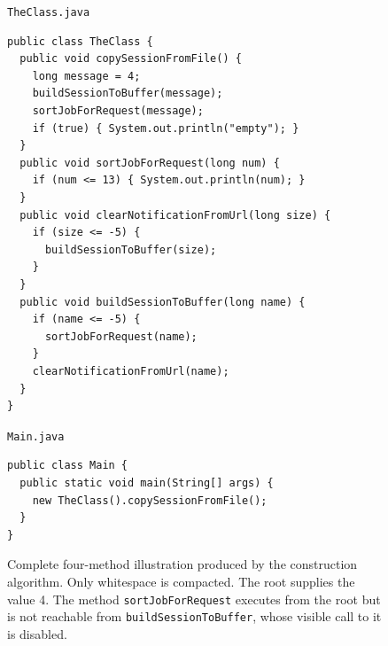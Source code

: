\begin{figure}[t]
\centering
\begin{minipage}{\columnwidth}
\footnotesize
\texttt{TheClass.java}
\begin{verbatim}
public class TheClass {
  public void copySessionFromFile() {
    long message = 4;
    buildSessionToBuffer(message);
    sortJobForRequest(message);
    if (true) { System.out.println("empty"); }
  }
  public void sortJobForRequest(long num) {
    if (num <= 13) { System.out.println(num); }
  }
  public void clearNotificationFromUrl(long size) {
    if (size <= -5) {
      buildSessionToBuffer(size);
    }
  }
  public void buildSessionToBuffer(long name) {
    if (name <= -5) {
      sortJobForRequest(name);
    }
    clearNotificationFromUrl(name);
  }
}
\end{verbatim}
\texttt{Main.java}
\begin{verbatim}
public class Main {
  public static void main(String[] args) {
    new TheClass().copySessionFromFile();
  }
}
\end{verbatim}
\end{minipage}
\caption{Complete four-method illustration produced by the construction algorithm. Only whitespace is compacted. The root supplies the value 4. The method \texttt{sortJobForRequest} executes from the root but is not reachable from \texttt{buildSessionToBuffer}, whose visible call to it is disabled.}
\label{fig:background-example}
\end{figure}
